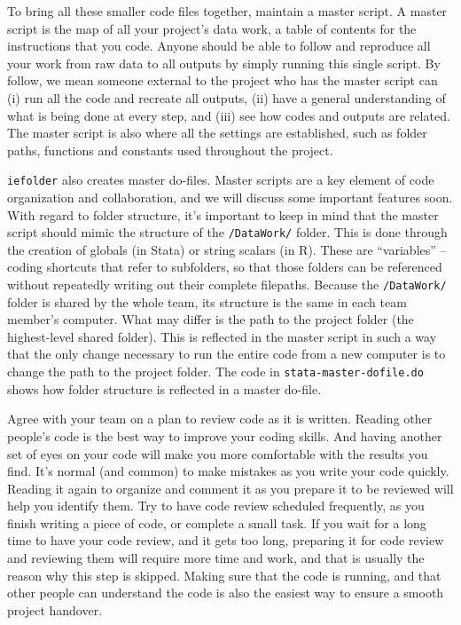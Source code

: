 
To bring all these smaller code files together, maintain a master script.
A master script is the map of all your project's data work,
a table of contents for the instructions that you code.
Anyone should be able to follow and reproduce all your work from
raw data to all outputs by simply running this single script.
By follow, we mean someone external to the project who has the master script can
(i) run all the code and recreate all outputs,
(ii) have a general understanding of what is being done at every step, and
(iii) see how codes and outputs are related.
The master script is also where all the settings are established,
such as folder paths, functions and constants used throughout the project.

\texttt{iefolder} also creates master do-files.
Master scripts are a key element of code organization and collaboration,
and we will discuss some important features soon.
With regard to folder structure, it's important to keep in mind
that the master script should mimic the structure of the \texttt{/DataWork/} folder.
This is done through the creation of globals (in Stata) or string scalars (in R).
These are ``variables'' -- coding shortcuts that refer to subfolders,
so that those folders can be referenced without repeatedly writing out their complete filepaths.
Because the \texttt{/DataWork/} folder is shared by the whole team,
its structure is the same in each team member's computer.
What may differ is the path to the project folder (the highest-level shared folder).
This is reflected in the master script in such a way that
the only change necessary to run the entire code from a new computer
is to change the path to the project folder.
The code in \texttt{stata-master-dofile.do} shows how folder structure is reflected in a master do-file.

Agree with your team on a plan to review code as it is written.
Reading other people's code is the best way to improve your coding skills.
And having another set of eyes on your code will make you more comfortable with the results you find.
It's normal (and common) to make mistakes as you write your code quickly.
Reading it again to organize and comment it as you prepare it to be reviewed will help you identify them.
Try to have code review scheduled frequently, as you finish writing a piece of code, or complete a small task.
If you wait for a long time to have your code review, and it gets too long,
preparing it for code review and reviewing them will require more time and work,
and that is usually the reason why this step is skipped.
Making sure that the code is running,
and that other people can understand the code is also the easiest way to ensure a smooth project handover.

